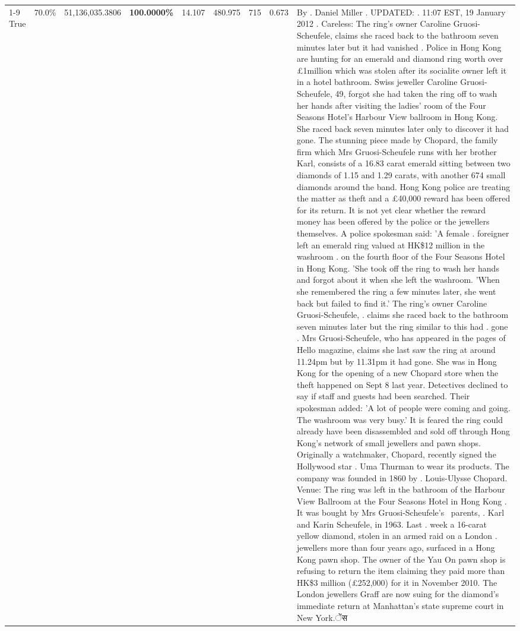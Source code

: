 \begin{table}[H]
\begin{tabular}{lllrlllll}
\cline{1-9}
True & 70.0\% & 51,136,035.3806 & \bfseries \color{red} 100.0000\% & 14.107 & 480.975 & 715 & 0.673 & By . Daniel Miller . UPDATED: . 11:07 EST, 19 January 2012 . Careless: The ring's owner Caroline Gruosi-Scheufele, claims she raced back to the bathroom seven minutes later but it had vanished . Police in Hong Kong are hunting for an emerald and diamond ring worth over £1million which was stolen after its socialite owner left it in a hotel bathroom. Swiss jeweller Caroline Gruosi-Scheufele, 49, forgot she had taken the ring off to wash her hands after visiting the ladies' room of the Four Seasons Hotel's Harbour View ballroom in Hong Kong. She raced back seven minutes later only to discover it had gone. The stunning piece made by Chopard, the family firm which Mrs Gruosi-Scheufele runs with her brother Karl, consists of a 16.83 carat emerald sitting between two diamonds of 1.15 and 1.29 carats, with another 674 small diamonds around the band. Hong Kong police are treating the matter as theft and a £40,000 reward has been offered for its return. It is not yet clear whether the reward money has been offered by the police or the jewellers themselves. A police spokesman said: 'A female . foreigner left an emerald ring valued at HK\$12 million in the washroom . on the fourth floor of the Four Seasons Hotel in Hong Kong. 'She took off the ring to wash her hands and forgot about it when she left the washroom. 'When she remembered the ring a few minutes later, she went back but failed to find it.' The ring's owner Caroline Gruosi-Scheufele, . claims she raced back to the bathroom seven minutes later but the ring similar to this had . gone . Mrs Gruosi-Scheufele, who has appeared in the pages of Hello magazine, claims she last saw the ring at around 11.24pm but by 11.31pm it had gone. She was in Hong Kong for the opening of a new Chopard store when the theft happened on Sept 8 last year. Detectives declined to say if staff and guests had been searched. Their spokesman added: 'A lot of people were coming and going. The washroom was very busy.' It is feared the ring could already have been disassembled and sold off through Hong Kong's network of small jewellers and pawn shops. Originally a watchmaker, Chopard, recently signed the Hollywood star . Uma Thurman to wear its products. The company was founded in 1860 by . Louis-Ulysse Chopard. Venue: The ring was left in the bathroom of the Harbour View Ballroom at the Four Seasons Hotel in Hong Kong . It was bought by Mrs Gruosi-Scheufele's  parents, . Karl and Karin Scheufele, in 1963. Last . week a 16-carat yellow diamond, stolen in an armed raid on a London . jewellers more than four years ago, surfaced in a Hong Kong pawn shop. The owner of the Yau On pawn shop is refusing to return the item claiming they paid more than HK\$3 million (£252,000) for it in November 2010. The London jewellers Graff are now suing for the diamond’s immediate return at Manhattan’s state supreme court in New York.ेंस \\

\end{tabular}
\end{table}
